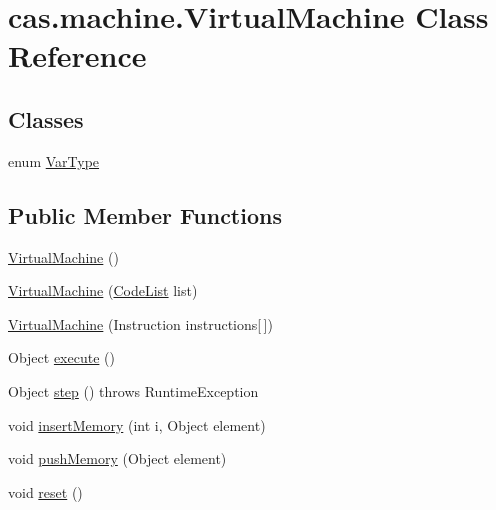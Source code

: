 \hypertarget{classcas_1_1machine_1_1_virtual_machine}{\section{cas.\-machine.\-Virtual\-Machine Class Reference}
\label{classcas_1_1machine_1_1_virtual_machine}
}
\subsection*{Classes}
\begin{DoxyCompactItemize}
\item 
enum \hyperlink{enumcas_1_1machine_1_1_virtual_machine_1_1_var_type}{Var\-Type}
\end{DoxyCompactItemize}
\subsection*{Public Member Functions}
\begin{DoxyCompactItemize}
\item 
\hyperlink{classcas_1_1machine_1_1_virtual_machine_ac8d09a9686872aed0c9b7782446819f2}{Virtual\-Machine} ()
\item 
\hyperlink{classcas_1_1machine_1_1_virtual_machine_acbbcc8ca352e51129a43c9a3a3718754}{Virtual\-Machine} (\hyperlink{classcas_1_1parser_1_1parser__containers_1_1_code_list}{Code\-List} list)
\item 
\hyperlink{classcas_1_1machine_1_1_virtual_machine_a1eb1370751ba6246de430051e075b3b1}{Virtual\-Machine} (Instruction instructions\mbox{[}$\,$\mbox{]})
\item 
Object \hyperlink{classcas_1_1machine_1_1_virtual_machine_a0e43df1c0a5832701e9c8a777844a499}{execute} ()
\item 
Object \hyperlink{classcas_1_1machine_1_1_virtual_machine_a3b1fd3da1be7d57711197416f3ef7b67}{step} ()  throws Runtime\-Exception 
\item 
void \hyperlink{classcas_1_1machine_1_1_virtual_machine_a4cc756bb1c0b6e5a1b69c1f819289685}{insert\-Memory} (int i, Object element)
\item 
void \hyperlink{classcas_1_1machine_1_1_virtual_machine_afc4f326f23930f945a704b35f819a21b}{push\-Memory} (Object element)
\item 
void \hyperlink{classcas_1_1machine_1_1_virtual_machine_a195dc7502075e8feaa1998f99230916e}{reset} ()
\end{DoxyCompactItemize}


